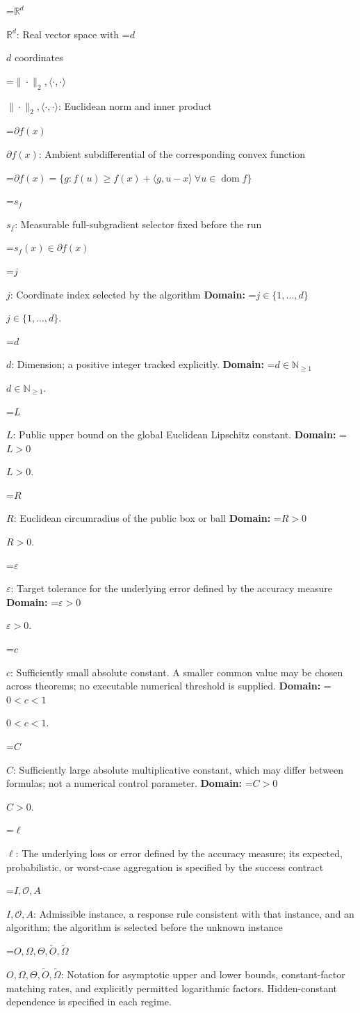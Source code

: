 \documentclass[10pt,a4paper]{article}
\newcommand{\AtlasMath}[1]{\par\begingroup\centering\setbox0=\hbox{$\displaystyle #1$}\ifdim\wd0>1.4\linewidth\typeout{ATLAS WIDE FORMULA: \the\wd0}\fi\ifdim\wd0>\linewidth\resizebox{\linewidth}{!}{\box0}\else\box0\fi\par\endgroup}
\newcommand{\AtlasInlineMath}[1]{\begingroup\setbox0=\hbox{$#1$}\ifdim\wd0>.4\linewidth\endgroup\AtlasMath{#1}\else\endgroup$#1$\fi}
\begin{document}
\AtlasInlineMath{\mathbb{R}^d}: Real vector space with \AtlasInlineMath{d} coordinates

\AtlasInlineMath{\|\cdot\|_2,\langle\cdot,\cdot\rangle}: Euclidean norm and inner product

\AtlasInlineMath{\partial f(x)}: Ambient subdifferential of the corresponding convex function


\AtlasMath{\partial f(x)=\{g:f(u)\ge f(x)+\langle g,u-x\rangle\ \forall u\in\operatorname{dom}f\}}


\AtlasInlineMath{s_f}: Measurable full-subgradient selector fixed before the run


\AtlasMath{s_f(x)\in\partial f(x)}


\AtlasInlineMath{j}: Coordinate index selected by the algorithm \textbf{Domain:} \AtlasInlineMath{j\in\{1,\ldots,d\}}.

\AtlasInlineMath{d}: Dimension; a positive integer tracked explicitly. \textbf{Domain:} \AtlasInlineMath{d\in\mathbb{N}_{\ge1}}.

\AtlasInlineMath{L}: Public upper bound on the global Euclidean Lipschitz constant. \textbf{Domain:} \AtlasInlineMath{L>0}.

\AtlasInlineMath{R}: Euclidean circumradius of the public box or ball \textbf{Domain:} \AtlasInlineMath{R>0}.

\AtlasInlineMath{\varepsilon}: Target tolerance for the underlying error defined by the accuracy measure \textbf{Domain:} \AtlasInlineMath{\varepsilon>0}.

\AtlasInlineMath{c}: Sufficiently small absolute constant. A smaller common value may be chosen across theorems; no executable numerical threshold is supplied. \textbf{Domain:} \AtlasInlineMath{0<c<1}.

\AtlasInlineMath{C}: Sufficiently large absolute multiplicative constant, which may differ between formulas; not a numerical control parameter. \textbf{Domain:} \AtlasInlineMath{C>0}.

\AtlasInlineMath{\ell}: The underlying loss or error defined by the accuracy measure; its expected, probabilistic, or worst-case aggregation is specified by the success contract

\AtlasInlineMath{I,\mathcal{O},A}: Admissible instance, a response rule consistent with that instance, and an algorithm; the algorithm is selected before the unknown instance

\AtlasInlineMath{O,\Omega,\Theta,\widetilde{O},\widetilde\Omega}: Notation for asymptotic upper and lower bounds, constant-factor matching rates, and explicitly permitted logarithmic factors. Hidden-constant dependence is specified in each regime.
\end{document}
